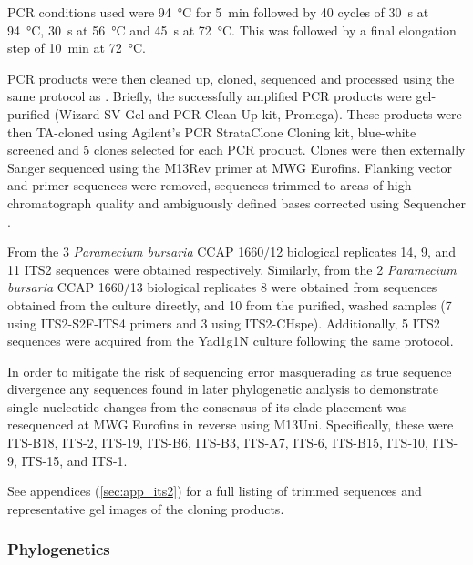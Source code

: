 PCR conditions used were \SI{94}{\degreeCelsius} for \SI{5}{\minute} followed by
40 cycles of \SI{30}{\second} at \SI{94}{\degreeCelsius}, \SI{30}{\second} at \SI{56}{\degreeCelsius}
and \SI{45}{\second} at \SI{72}{\degreeCelsius}. This was followed by a final
elongation step of \SI{10}{\minute} at \SI{72}{\degreeCelsius}. 


PCR products were then cleaned up, cloned, sequenced
and processed using the same protocol as \citep{Maguire2014a}.
Briefly, the successfully amplified PCR products were gel-purified 
(Wizard SV Gel and PCR Clean-Up kit, Promega).
These products were then TA-cloned 
using Agilent's PCR StrataClone Cloning kit, blue-white screened and 5 clones
selected for each PCR product.  
Clones were then externally Sanger sequenced using the M13Rev primer
at MWG Eurofins. 
Flanking vector and primer sequences were removed, sequences trimmed to 
areas of high chromatograph quality and ambiguously defined bases corrected
using Sequencher \citep{Sequencher}.

From the 3 \textit{Paramecium bursaria} CCAP 1660/12 biological replicates
14, 9, and 11 ITS2 sequences were obtained respectively.
Similarly, from the 2 \textit{Paramecium bursaria} CCAP 1660/13 biological replicates
8 were obtained from sequences obtained from the culture directly, and 10
from the purified, washed samples (7 using ITS2-S2F-ITS4 primers and 3 using
ITS2-CHspe).  Additionally, 5 ITS2 sequences were acquired from the Yad1g1N
culture following the same protocol. 

In order to mitigate the risk of sequencing error masquerading
as true sequence divergence any sequences found in later phylogenetic
analysis to demonstrate single nucleotide changes from the consensus
of its clade placement was resequenced at MWG Eurofins in reverse 
using M13Uni.  Specifically, these were ITS-B18,
ITS-2, ITS-19, ITS-B6, ITS-B3, ITS-A7, ITS-6, ITS-B15,
ITS-10, ITS-9, ITS-15, and ITS-1.

See appendices (\cref{sec:app_its2}) for a full listing of trimmed sequences
and representative gel images of the cloning products.

\subsubsection{Phylogenetics}

